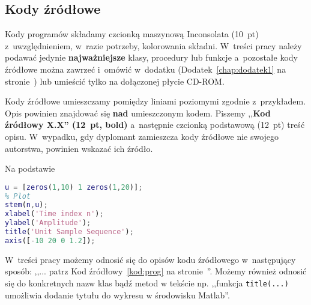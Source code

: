\documentclass[skorowidz,skroty]{dyplomWEZUT}
\begin{document}
\subsection{Kody źródłowe}

Kody programów składamy czcionką maszynową Inconsolata (10~pt) z~uwzględnieniem, w~razie potrzeby, kolorowania składni. W~treści pracy należy podawać jedynie \textbf{najważniejsze} klasy, procedury lub funkcje a~pozostałe kody źródłowe można zawrzeć i~omówić w~dodatku (Dodatek~\ref{chap:dodatek1} na stronie~\pageref{chap:dodatek1}) lub umieścić tylko na dołączonej płycie CD-ROM.

Kody źródłowe umieszczamy pomiędzy liniami poziomymi zgodnie z~przykładem. Opis powinien znajdować się \textbf{nad} umieszczonym kodem. Piszemy ,,\textbf{Kod źródłowy X.X'' (12~pt, bold)} a~następnie czcionką podstawową (12~pt) treść opisu. W~wypadku, gdy dyplomant zamieszcza kody źródłowe nie swojego autorstwa, powinien wskazać ich źródło.

%
%
%

{Na podstawie \cite{Mathworks2004}}{\label{kod:prog}}
\begin{lstlisting}[language=Matlab]
% To jest przykład
u = [zeros(1,10) 1 zeros(1,20)];
% Plot
stem(n,u);
xlabel('Time index n');
ylabel('Amplitude');
title('Unit Sample Sequence');
axis([-10 20 0 1.2]);
\end{lstlisting}

W~treści pracy możemy odnosić się do opisów kodu źródłowego w~następujący sposób: ,,... patrz Kod źródłowy~\ref{kod:prog} na stronie~\pageref{kod:prog}''. Możemy również odnosić się do konkretnych nazw klas bądź metod w tekście np. ,,funkcja \lstinline|title(...)| umożliwia dodanie tytułu do wykresu w środowisku Matlab''.
\end{document}
